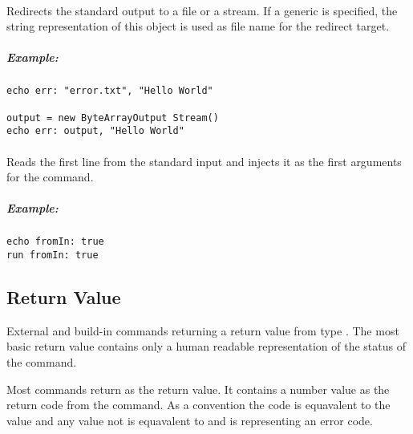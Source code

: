 \paragraph{}

Redirects the standard output to a
file or a stream. If a generic  is specified, the string
representation of this object is used as file name for the redirect target.

\subparagraph{Example:}

\begin{lstlisting}[style=Groovybash, label={lst:example_flag_err}]
echo err: "error.txt", "Hello World"

output = new ByteArrayOutput Stream()
echo err: output, "Hello World"
\end{lstlisting}

\paragraph{}

Reads the first line from the standard input and injects it as the first
arguments for the command.

\subparagraph{Example:}

\begin{lstlisting}[style=Groovybash, label={lst:example_flag_fromin}]
echo fromIn: true
run fromIn: true
\end{lstlisting}

\subsection{Return Value}

External and build-in commands returning a return value from type
. The most basic return value contains only a human readable
representation of the status of the command.

Most commands return  as the return value. It contains a number
value as the return code from the command. As a convention the
code  is equavalent to the value  and any value not 
is equavalent to  and is representing an error code.
